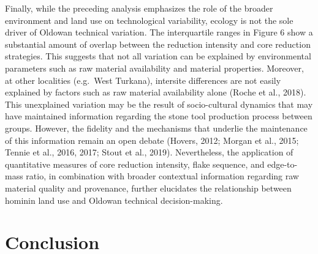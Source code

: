 \documentclass[]{elsarticle} %
\begin{document}
Finally, while the preceding analysis emphasizes the role of the broader
environment and land use on technological variability, ecology is not
the sole driver of Oldowan technical variation. The interquartile ranges
in \hspace{0pt}Figure 6\hspace{0pt} show a substantial amount of overlap
between the reduction intensity and core reduction strategies. This
suggests that not all variation can be explained by environmental
parameters such as raw material availability and material properties.
Moreover, at other localities (e.g.~West Turkana), intersite differences
are not easily explained by factors such as raw material availability
alone (\hspace{0pt}Roche et al., 2018\hspace{0pt}). This unexplained
variation may be the result of socio-cultural dynamics that may have
maintained information regarding the stone tool production process
between groups. However, the fidelity and the mechanisms that underlie
the maintenance of this information remain an open debate
(\hspace{0pt}Hovers, 2012\hspace{0pt}; \hspace{0pt}Morgan et al.,
2015\hspace{0pt}; \hspace{0pt}Tennie et al., 2016\hspace{0pt},
\hspace{0pt}2017\hspace{0pt}; \hspace{0pt}Stout et al.,
2019\hspace{0pt}). Nevertheless, the application of quantitative
measures of core reduction intensity, flake sequence, and edge-to-mass
ratio, in combination with broader contextual information regarding raw
material quality and provenance, further elucidates the relationship
between hominin land use and Oldowan technical decision-making.

\hypertarget{conclusion}{%
\section{Conclusion}\label{conclusion}}
\end{document}
